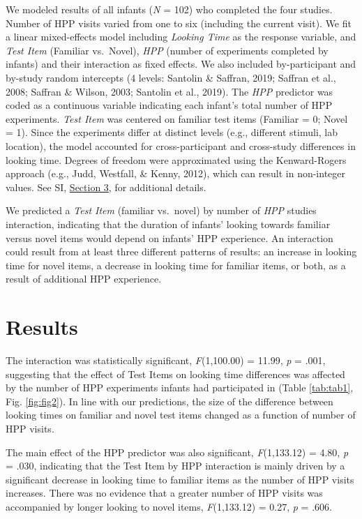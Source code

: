 \documentclass[english,man,man,floatsintext]{apa6}
\begin{document}
We modeled results of all infants (\emph{N} = 102) who completed the four studies. Number of HPP visits varied from one to six (including the current visit). We fit a linear mixed-effects model including \emph{Looking Time} as the response variable, and \emph{Test Item} (Familiar vs.~Novel), \emph{HPP} (number of experiments completed by infants) and their interaction as fixed effects. We also included by-participant and by-study random intercepts (4 levels: Santolin \& Saffran, 2019; Saffran et al., 2008; Saffran \& Wilson, 2003; Santolin et al., 2019). The \emph{HPP} predictor was coded as a continuous variable indicating each infant's total number of HPP experiments. \emph{Test Item} was centered on familiar test items (Familiar = 0; Novel = 1). Since the experiments differ at distinct levels (e.g., different stimuli, lab location), the model accounted for cross-participant and cross-study differences in looking time. Degrees of freedom were approximated using the Kenward-Rogers approach (e.g., Judd, Westfall, \& Kenny, 2012), which can result in non-integer values. See SI, \protect\hyperlink{s3}{Section 3}, for additional details.

We predicted a \emph{Test Item} (familiar vs.~novel) by number of \emph{HPP} studies interaction, indicating that the duration of infants' looking towards familiar versus novel items would depend on infants' HPP experience. An interaction could result from at least three different patterns of results: an increase in looking time for novel items, a decrease in looking time for familiar items, or both, as a result of additional HPP experience.

\hypertarget{results}{%
\section{Results}\label{results}}

The interaction was statistically significant, \emph{F}(1,100.00) = 11.99, \emph{p} = .001, suggesting that the effect of Test Items on looking time differences was affected by the number of HPP experiments infants had participated in (Table \ref{tab:tab1}, Fig. \ref{fig:fig2}). In line with our predictions, the size of the difference between looking times on familiar and novel test items changed as a function of number of HPP visits.

The main effect of the HPP predictor was also significant, \emph{F}(1,133.12) = 4.80, \emph{p} = .030, indicating that the Test Item by HPP interaction is mainly driven by a significant decrease in looking time to familiar items as the number of HPP visits increases. There was no evidence that a greater number of HPP visits was accompanied by longer looking to novel items, \emph{F}(1,133.12) = 0.27, \emph{p} = .606.
\end{document}
